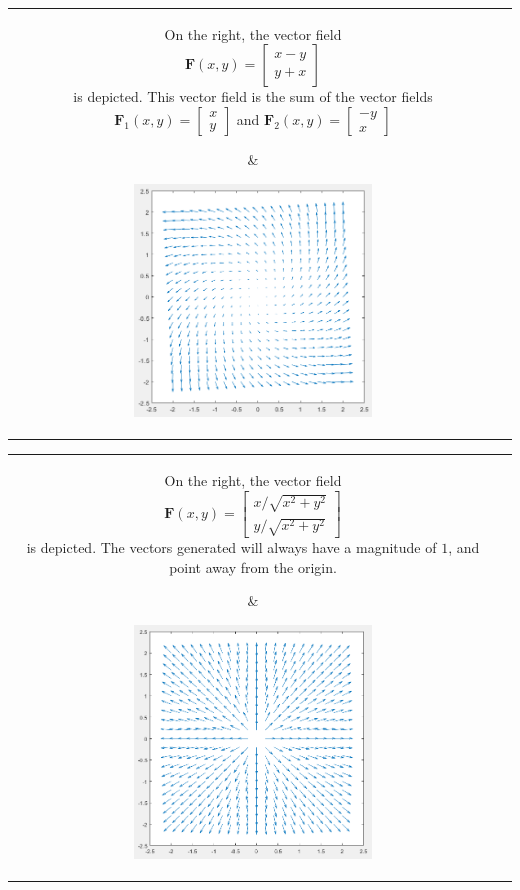 \documentclass{article}
\begin{document}
\begin{tabular}{cc}
\parbox{0.5\textwidth}{
On the right, the vector field 
\[\mathbf{F}(x,y) = \begin{bmatrix} x - y \\ y + x \end{bmatrix}\]
is depicted. This vector field is the sum of the vector fields \(\mathbf{F}_1(x,y) = \begin{bmatrix} x \\ y \end{bmatrix}\) and \(\mathbf{F}_2(x,y) = \begin{bmatrix} -y \\ x \end{bmatrix}\)    
} & \parbox{0.5\textwidth}{
\includegraphics[width = 0.5\textwidth]{example_vector_field_6}
}
\end{tabular}

\begin{tabular}{cc}
\parbox{0.5\textwidth}{
On the right, the vector field 
\[\mathbf{F}(x,y) = \begin{bmatrix} x/\sqrt{x^2 + y^2} \\ y/\sqrt{x^2 + y^2} \end{bmatrix}\]
is depicted. The vectors generated will always have a magnitude of \(1\), and point away from the origin. 
} & \parbox{0.5\textwidth}{
\includegraphics[width = 0.5\textwidth]{example_vector_field_7}
}
\end{tabular}
\end{document}
